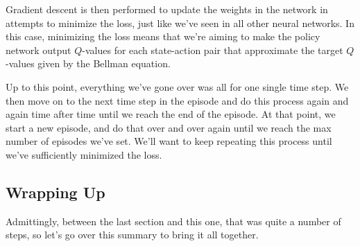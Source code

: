Gradient descent is then performed to update the weights in the network in attempts to 
minimize the loss, just like we've seen in all other neural networks. In this case, 
minimizing the loss means that we're aiming to make the policy network output $Q$-values 
for each state-action pair that approximate the target $Q$-values given by the Bellman 
equation.

Up to this point, everything we've gone over was all for one single time step. We then 
move on to the next time step in the episode and do this process again and again time 
after time until we reach the end of the episode. At that point, we start a new episode, 
and do that over and over again until we reach the max number of episodes we've set. We'll 
want to keep repeating this process until we've sufficiently minimized the loss.


\subsection{Wrapping Up}

Admittingly, between the last section and this one, that was quite a number of steps, so 
let's go over this summary to bring it all together.

